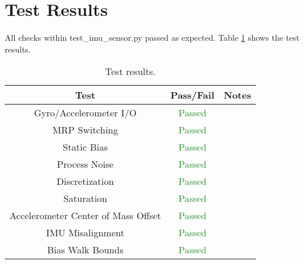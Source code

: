 \documentclass[]{BasiliskReportMemo}
\begin{document}
\section{Test Results}

All checks within test\_imu\_sensor.py passed as expected. Table \ref{tab:results} shows the test results.

\begin{table}[htbp]
	\caption{Test results.}
	\label{tab:results}
	\centering \fontsize{10}{10}\selectfont
	\begin{tabular}{c | c | c  } %
		\hline
		\textbf{Test} & \textbf{Pass/Fail} & \textbf{Notes} \\ \hline
		Gyro/Accelerometer I/O & \textcolor{ForestGreen}{Passed} & \\ \hline
		MRP Switching & \textcolor{ForestGreen}{Passed} & \\ \hline
		Static Bias & \textcolor{ForestGreen}{Passed} & \\ \hline
		Process Noise & \textcolor{ForestGreen}{Passed} & \\ \hline
		Discretization & \textcolor{ForestGreen}{Passed} & \\ \hline
		Saturation & \textcolor{ForestGreen}{Passed} & \\ \hline
		Accelerometer Center of Mass Offset & \textcolor{ForestGreen}{Passed} & \\ \hline
		IMU Misalignment & \textcolor{ForestGreen}{Passed} & \\ \hline
		Bias Walk Bounds & \textcolor{ForestGreen}{Passed} & \\ \hline
	\end{tabular}
\end{table}
\end{document}
